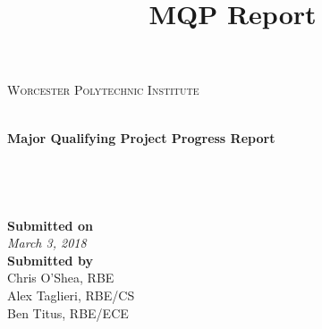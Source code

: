 \documentclass[letterpaper,12pt,titlepage]{article}
\title{MQP Report}
\begin{document}
\begin{titlepage}
\begin{center}
\begin{minipage}{0.4\textwidth}
\end{minipage}
\begin{minipage}{0.5\textwidth}
\centering
\textsc{Worcester Polytechnic Institute}
\end{minipage}
\\ 
\vspace*{1cm}
	\Huge
	\textbf{Major Qualifying Project Progress Report}\\
\vspace{1cm}
	\LARGE
	\\
\vspace{2cm}
	\Large
	\text{}\\
    \textbf{}\\
    \textbf{}\\
\vfill
\vspace{0.8cm}
	\LARGE
	\textbf{Submitted on} \\
    \Large
	\textit{March 3, 2018} \\
    
\vspace{0.8cm}
	\LARGE
	\textbf{Submitted by} \\
    \Large
	Chris O'Shea, RBE\\
	\Large
    Alex Taglieri, RBE/CS \\
	\Large
    Ben Titus, RBE/ECE \\
    
\vfill
\end{center}
\end{titlepage}

\newpage
	\tableofcontents
	\newpage
	\listoffigures
	\newpage
	\listoftables
\newpage



%

%
%
%
%

% 
\pagebreak

{}

\begin{appendices}
%
%
%
\end{appendices}
\end{document}
